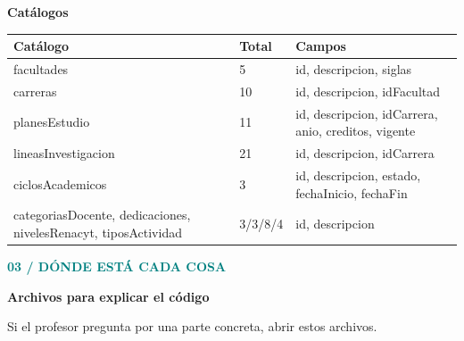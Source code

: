 \documentclass[11pt,a4paper]{article}
\newcommand{\titulo}[3]{\textcolor{teal}{\small\textbf{#1}}\par{\LARGE\bfseries #2}\par\vspace{2mm}#3\par\vspace{3mm}}
\begin{document}
\textbf{Catálogos}\par
\begin{tabularx}{\textwidth}{>{\raggedright\arraybackslash}p{44mm} p{14mm} >{\raggedright\arraybackslash}X}
\hline
\textbf{Catálogo} & \textbf{Total} & \textbf{Campos} \\ \hline
facultades & 5 & id, descripcion, siglas \\
carreras & 10 & id, descripcion, idFacultad \\
planesEstudio & 11 & id, descripcion, idCarrera, anio, creditos, vigente \\
lineasInvestigacion & 21 & id, descripcion, idCarrera \\
ciclosAcademicos & 3 & id, descripcion, estado, fechaInicio, fechaFin \\
categoriasDocente, dedicaciones, nivelesRenacyt, tiposActividad & 3/3/8/4 & id, descripcion \\ \hline
\end{tabularx}
\newpage

\titulo{03 / DÓNDE ESTÁ CADA COSA}{Archivos para explicar el código}{Si el profesor pregunta por una parte concreta, abrir estos archivos.}
\end{document}
